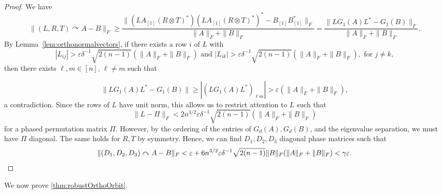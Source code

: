 \documentclass[11pt]{article}
\numberwithin{equation}{section}
\theoremstyle{remark}
\begin{document}
\begin{proof}
We have \[\|(L,R,T)\curvearrowright A-B\|_F\geq \frac{\|(L A_{[1]} (R\otimes T)^*)(L A_{[1]} (R\otimes T)^*)^* - B_{[1]}B_{[1]}^*\|_F}{\|A\|_F+\|B\|_F}=\frac{\|LG_1(A)L^* - G_1(B)\|_F}{\|A\|_F+\|B\|_F}.\]
By Lemma~\ref{lem:orthonormalvectors}, if there exists a row $i$ of $L$ with 
\[|L_{ij}|>\varepsilon \delta^{-1}\sqrt{2(n-1)} (\|A\|_F+\|B\|_F) 
\text{ and }|L_{ik}|>\varepsilon \delta^{-1} \sqrt{2(n-1)}(\|A\|_F+\|B\|_F), \text{ for } j\neq k,\] 
then there exists $\ell,m\in [n]$, $\ell\neq m$ such that 

\[\|LG_1(A)L^* - G_1(B)\| \geq |(LG_1(A)L^*)_{\ell m}|>\varepsilon (\|A\|_F+\|B\|_F),\] 
a contradiction. Since the rows of $L$ have unit norm, 
this allows us to restrict attention to $L$ such that 
\[\|L-\Pi\|_F< 2n^{3/2}\varepsilon \delta^{-1} \sqrt{2(n-1)} (\|A\|_F+\|B\|_F)\] 
for a phased permutation
matrix $\Pi$. However, by the ordering of the entries of $G_d(A), G_d(B)$, and the eigenvalue
separation, we must have $\Pi$ diagonal. The same holds for $R,T$ by symmetry. Hence,
we can find $D_1,D_2,D_3$ diagonal phase matrices such that 
\[\|(D_1,D_2,D_3)\curvearrowright A- B\|_F< \varepsilon + 6n^{3/2} \varepsilon \delta^{-1}\sqrt{2(n-1)}\|B\|_F(\|A\|_F+\|B\|_F)<\gamma\varepsilon.
\qedhere
\] 
\end{proof}

We now prove \cref{thm:robustOrthoOrbit}.
\end{document}
